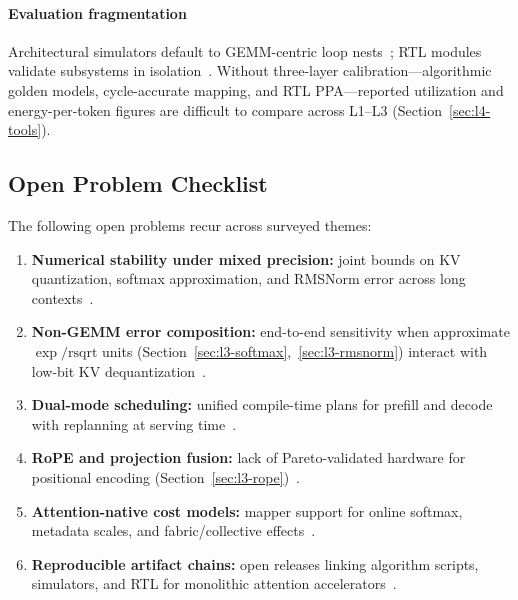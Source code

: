 \documentclass[conference]{IEEEtran}
\begin{document}
\paragraph{Evaluation fragmentation}
Architectural simulators default to GEMM-centric loop nests~\cite{parashar2019timeloop,scalesimv3_2025,klhufek2025transinfersim}; RTL modules validate subsystems in isolation~\cite{lin2025systolicattention,mive2026}.
Without three-layer calibration---algorithmic golden models, cycle-accurate mapping, and RTL PPA---reported utilization and energy-per-token figures are difficult to compare across L1--L3 (Section~\ref{sec:l4-tools}).

\subsection{Open Problem Checklist}
\label{sec:gaps-open}

The following open problems recur across surveyed themes:
\begin{enumerate}
  \item \textbf{Numerical stability under mixed precision:} joint bounds on KV quantization, softmax approximation, and RMSNorm error across long contexts~\cite{guaranteednorm2026,sole2025,batquant2026,ultraquant2026}.
  \item \textbf{Non-GEMM error composition:} end-to-end sensitivity when approximate $\exp/\mathrm{rsqrt}$ units (Section~\ref{sec:l3-softmax},~\ref{sec:l3-rmsnorm}) interact with low-bit KV dequantization~\cite{lin2025systolicattention,liu2024kivi,mive2026}.
  \item \textbf{Dual-mode scheduling:} unified compile-time plans for prefill and decode with replanning at serving time~\cite{plena2025,streamattention2025,dao2023flashdecoding}.
  \item \textbf{RoPE and projection fusion:} lack of Pareto-validated hardware for positional encoding (Section~\ref{sec:l3-rope})~\cite{su2024roformer,plena2025}.
  \item \textbf{Attention-native cost models:} mapper support for online softmax, metadata scales, and fabric/collective effects~\cite{flatattention2026,parashar2019timeloop,scalesimv3_2025}.
  \item \textbf{Reproducible artifact chains:} open releases linking algorithm scripts, simulators, and RTL for monolithic attention accelerators~\cite{plena2025,klhufek2025transinfersim,sawint42026}.
\end{enumerate}
\end{document}
